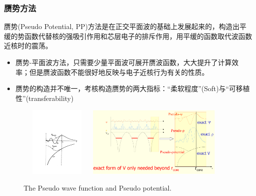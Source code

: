 \frame
{
\frametitle{赝势方法}
赝势(\textrm{Pseudo Potential, PP})方法是在正交平面波的基础上发展起来的，构造出平缓的势函数代替核的强吸引作用和芯层电子的排斥作用，用平缓的函数取代波函数近核时的震荡。
\begin{itemize}
\setlength{\itemsep}{5pt}
	\item 赝势-平面波方法，只需要少量平面波可展开赝波函数，大大提升了计算效率；但是赝波函数不能很好地反映与电子近核行为有关的性质。
	\item 赝势的构造并不唯一，考核构造赝势的两大指标：“柔软程度”\textrm{(Soft)}与“可移植性”\textrm{(transferability)}
\end{itemize}
\begin{figure}[h!]
\centering
\vspace*{-0.10in}
\includegraphics[height=1.35in,width=1.42in,viewport=154 100 562 508,clip]{Figures/Pseudo.pdf}
\includegraphics[height=1.35in,width=2.57in,viewport=1 1 980 500,clip]{Figures/Pseudo-2.png}
\caption{\small \textrm{The Pseudo wave function and Pseudo potential.}}%
\label{Pseudo_Potential-Wave}
\end{figure}
}

